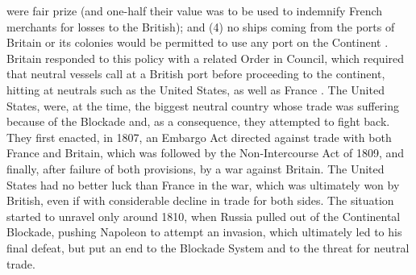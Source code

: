 \documentclass[12pt,a4paper,notitlepage,english]{article}
\begin{document}
were fair prize (and one-half their value was to be used to indemnify French merchants for losses to the British); and (4) no ships coming from the ports of Britain or its colonies would be permitted to use any port on the Continent \citep{davis2006naval}. Britain responded to this policy with a related Order in Council, which required that neutral vessels call at a British port before proceeding to the continent, hitting at neutrals such as the United States, as well as France \citep{davis2006naval}.
The United States, were, at the time, the biggest neutral country whose trade was suffering because of the Blockade and, as a consequence, they attempted to fight back. They first enacted, in 1807, an Embargo Act directed against trade with both France and Britain, which was followed by the Non-Intercourse Act of 1809, and finally, after failure of both provisions, by a war against Britain. The United States had no better luck than France in the war, which was ultimately won by British, even if with considerable decline in trade for both sides. The situation started to unravel only around 1810, when Russia pulled out of the Continental Blockade, pushing Napoleon to attempt an invasion, which ultimately led to his final defeat, but put an end to the Blockade System and to the threat for neutral trade. 
\end{document}
